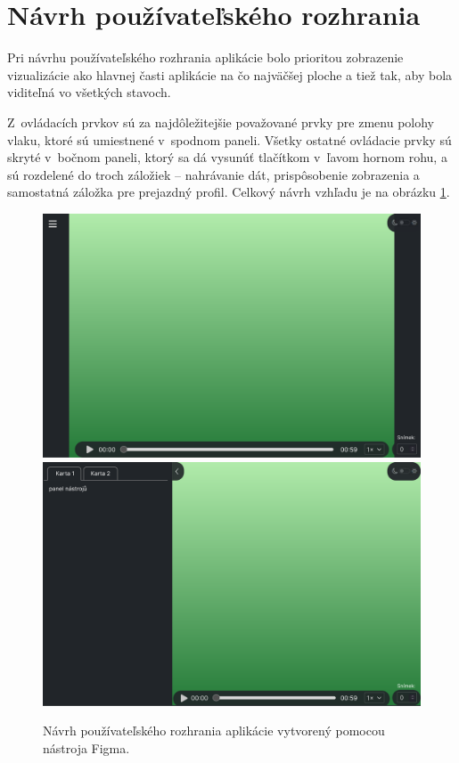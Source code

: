 \section{Návrh používateľského rozhrania}

Pri návrhu používateľského rozhrania aplikácie bolo prioritou zobrazenie vizualizácie ako hlavnej časti aplikácie na čo najväčšej ploche a tiež tak, aby bola viditeľná vo všetkých stavoch.

Z~ovládacích prvkov sú za najdôležitejšie považované prvky pre zmenu polohy vlaku, ktoré sú umiestnené v~spodnom paneli. Všetky ostatné ovládacie prvky sú skryté v~bočnom paneli, ktorý sa dá vysunúť tlačítkom v~ľavom hornom rohu, a sú rozdelené do troch záložiek -- nahrávanie dát, prispôsobenie zobrazenia a samostatná záložka pre prejazdný profil. Celkový návrh vzhľadu je na obrázku \ref{fig:navrh_gui}.

\begin{figure}[h]
    \centering
    \includegraphics[width=0.9\linewidth]{text_prace/obrazky-figures/navrh1.pdf}
    \includegraphics[width=0.9\linewidth]{text_prace/obrazky-figures/navrh2.pdf}
    \caption[Návrh používateľského rozhrania aplikácie.]{Návrh používateľského rozhrania aplikácie vytvorený pomocou nástroja Figma.}
    \label{fig:navrh_gui}
\end{figure}

